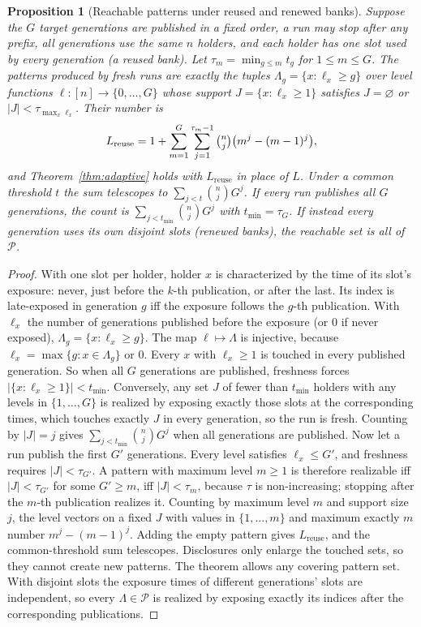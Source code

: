 \documentclass[pdflatex,sn-mathphys-num]{sn-jnl}%
\theoremstyle{plain}
\newtheorem{proposition}[theorem]{Proposition}
\theoremstyle{definition}
\begin{document}
\begin{proposition}[Reachable patterns under reused and renewed banks]\label{prop:patterns}
Suppose the $G$ target generations are published in a fixed order, a run may stop after any prefix, all generations use the same $n$ holders, and each holder has one slot used by every generation (a reused bank). Let $\tau_m=\min_{g\le m}t_g$ for $1\le m\le G$. The patterns produced by fresh runs are exactly the tuples $\Lambda_g=\{x:\ell_x\ge g\}$ over level functions $\ell:[n]\to\{0,\dots,G\}$ whose support $J=\{x:\ell_x\ge1\}$ satisfies $J=\varnothing$ or $|J|<\tau_{\max_x\ell_x}$. Their number is
\[
 L_{\mathrm{reuse}}=1+\sum_{m=1}^{G}\sum_{j=1}^{\tau_m-1}\tbinom nj\big(m^j-(m-1)^j\big),
\]
and Theorem~\ref{thm:adaptive} holds with $L_{\mathrm{reuse}}$ in place of $L$. Under a common threshold $t$ the sum telescopes to $\sum_{j<t}\binom njG^j$. If every run publishes all $G$ generations, the count is $\sum_{j<t_{\min}}\binom njG^j$ with $t_{\min}=\tau_G$. If instead every generation uses its own disjoint slots (renewed banks), the reachable set is all of $\mathcal P$.
\end{proposition}
\begin{proof}
With one slot per holder, holder $x$ is characterized by the time of its slot's exposure: never, just before the $k$-th publication, or after the last. Its index is late-exposed in generation $g$ iff the exposure follows the $g$-th publication. With $\ell_x$ the number of generations published before the exposure (or $0$ if never exposed), $\Lambda_g=\{x:\ell_x\ge g\}$. The map $\ell\mapsto\Lambda$ is injective, because $\ell_x=\max\{g:x\in\Lambda_g\}$ or $0$. Every $x$ with $\ell_x\ge1$ is touched in every published generation. So when all $G$ generations are published, freshness forces $|\{x:\ell_x\ge1\}|<t_{\min}$. Conversely, any set $J$ of fewer than $t_{\min}$ holders with any levels in $\{1,\dots,G\}$ is realized by exposing exactly those slots at the corresponding times, which touches exactly $J$ in every generation, so the run is fresh. Counting by $|J|=j$ gives $\sum_{j<t_{\min}}\binom njG^j$ when all generations are published. Now let a run publish the first $G'$ generations. Every level satisfies $\ell_x\le G'$, and freshness requires $|J|<\tau_{G'}$. A pattern with maximum level $m\ge1$ is therefore realizable iff $|J|<\tau_{G'}$ for some $G'\ge m$, iff $|J|<\tau_m$, because $\tau$ is non-increasing; stopping after the $m$-th publication realizes it. Counting by maximum level $m$ and support size $j$, the level vectors on a fixed $J$ with values in $\{1,\dots,m\}$ and maximum exactly $m$ number $m^j-(m-1)^j$. Adding the empty pattern gives $L_{\mathrm{reuse}}$, and the common-threshold sum telescopes. Disclosures only enlarge the touched sets, so they cannot create new patterns. The theorem allows any covering pattern set. With disjoint slots the exposure times of different generations' slots are independent, so every $\Lambda\in\mathcal P$ is realized by exposing exactly its indices after the corresponding publications.
\end{proof}
\end{document}
